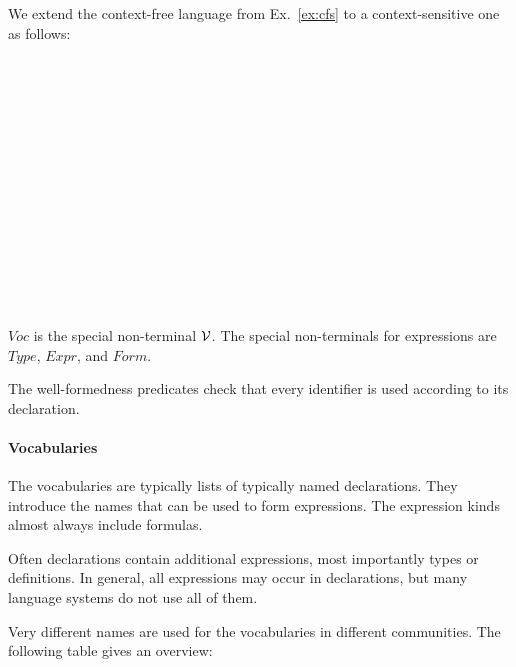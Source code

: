 \begin{example}\label{ex:css}
We extend the context-free language from Ex.~\ref{ex:cfs} to a context-sensitive one as follows:
\begin{commgrammar}
\\
\\
\\
\\
\\
\\
\\
\\
\\
\\
\\
\\
\\
\end{commgrammar}

$Voc$ is the special non-terminal $\mathcal{V}$. The special non-terminals for expressions are $Type$, $Expr$, and $Form$.

The well-formedness predicates check that every identifier is used according to its declaration.
\end{example}

\paragraph{Vocabularies}
The vocabularies are typically lists of typically named declarations.
They introduce the names that can be used to form expressions.
The expression kinds almost always include formulas.

Often declarations contain additional expressions, most importantly types or definitions.
In general, all expressions may occur in declarations, but many language systems do not use all of them.

Very different names are used for the vocabularies in different communities.
The following table gives an overview:

